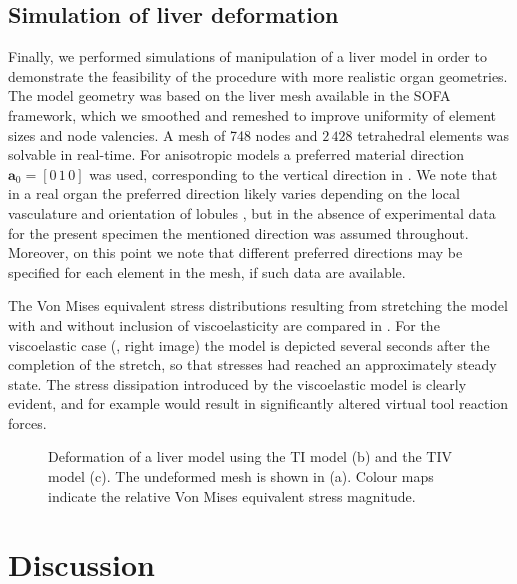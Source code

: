 	
	\subsection{Simulation of liver deformation} \label{chap6:liverSimu}
Finally, we performed simulations of manipulation of a liver model in order to demonstrate the feasibility of the procedure with more realistic organ geometries. The model geometry was based on the liver mesh available in the SOFA framework, which we smoothed and remeshed to improve uniformity of element sizes and node valencies. A mesh of 748 nodes and $2\,428$ tetrahedral elements was solvable in real-time. For anisotropic models a preferred material direction $\mathbf{a}_0 = [0\, 1\, 0] $ was used, corresponding to the vertical direction in . We note that in a real organ the preferred direction likely varies depending on the local vasculature and orientation of lobules \citep{Chui07}, but in the absence of experimental data for the present specimen the mentioned direction was assumed throughout. Moreover, on this point we note that different preferred directions may be specified for each element in the mesh, if such data are available. 

\bigskip

The Von Mises equivalent stress distributions resulting from stretching the model with and without inclusion of viscoelasticity are compared in . For the viscoelastic case (, right image) the model is depicted several seconds after the completion of the stretch, so that stresses had reached an approximately steady state. The stress dissipation introduced by the viscoelastic model is clearly evident, and for example would result in significantly altered virtual tool reaction forces.	
%
\begin{figure}[ht]
\centering 
{}
\hfill
{}
\hfill
{}
\caption[GPU solution times]{Deformation of a liver model using the TI model (b) and the TIV model (c). The undeformed mesh is shown in (a). Colour maps indicate the relative Von Mises equivalent stress magnitude.} 
\label{chap6:fig-liver}
\end{figure}

	
\section{Discussion}


